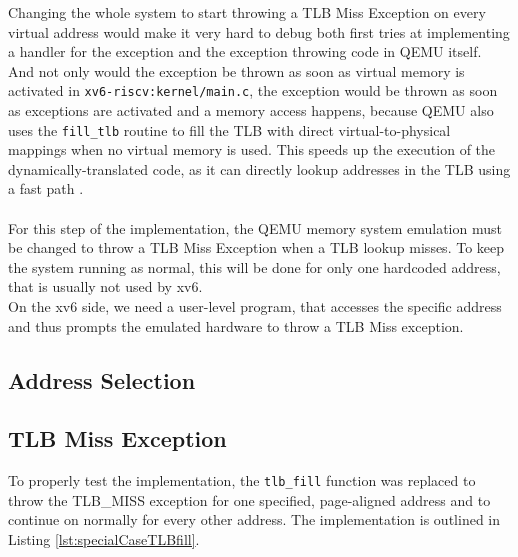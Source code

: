 Changing the whole system to start throwing a TLB Miss Exception on every virtual address would
make it very hard to debug both first tries at implementing a handler for the exception and the
exception throwing code in QEMU itself.\\
And not only would the exception be thrown as soon as virtual memory is activated in
\texttt{xv6-riscv:kernel/main.c}, the exception would be thrown
as soon as exceptions are activated and a memory access happens, because QEMU also uses the
\texttt{fill\_tlb} routine to fill the TLB with direct
virtual-to-physical mappings when no virtual memory is used. This speeds up the execution of
the dynamically-translated code, as it can directly
lookup addresses in the TLB using a fast path \cite{DeepDiveQEMU}.\\ \\
For this step of the implementation, the QEMU memory system emulation must be changed to throw a
TLB Miss Exception when a TLB lookup misses. To keep the system running as normal, this will
be done for only one hardcoded address, that is usually not used by xv6.\\
On the xv6 side, we need a user-level program, that accesses the specific address and thus prompts
the emulated hardware to throw a TLB Miss exception.


\subsection{Address Selection}
\subsection{TLB Miss Exception}


To properly test the implementation, the \texttt{tlb\_fill} function was replaced to throw the
TLB\_MISS exception for
one specified, page-aligned address and to continue on normally for every other address.
The implementation is outlined
in Listing \ref{lst:specialCaseTLBfill}.



